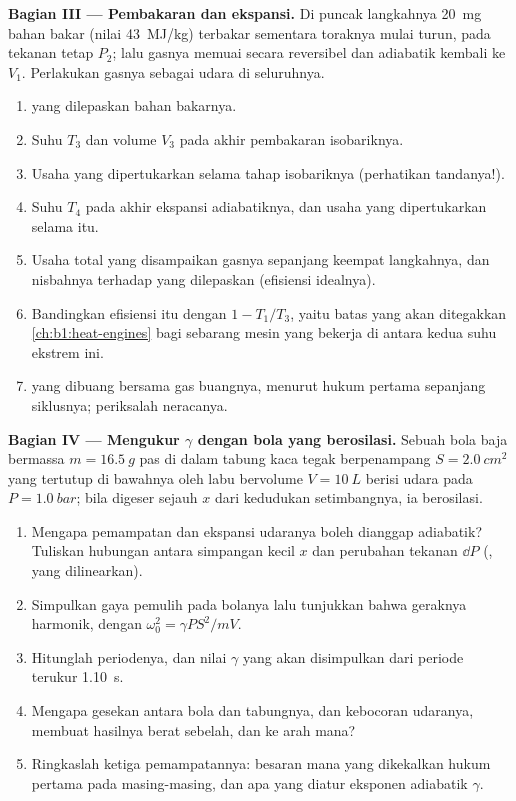 \begin{problem}
\medskip
\noindent\textbf{Bagian III --- Pembakaran dan ekspansi.}
Di puncak langkahnya \qty{20}{mg} bahan bakar (nilai 
\qty{43}{MJ/kg}) terbakar sementara toraknya mulai turun, pada tekanan tetap
$P_2$; lalu gasnya memuai secara reversibel dan adiabatik kembali ke $V_1$.
Perlakukan gasnya sebagai udara di seluruhnya.
\begin{enumerate}[resume]
  \item {} yang dilepaskan bahan bakarnya.
  \item Suhu $T_3$ dan volume $V_3$ pada akhir pembakaran
        isobariknya.
  \item Usaha yang dipertukarkan selama tahap isobariknya (perhatikan tandanya!).
  \item Suhu $T_4$ pada akhir ekspansi adiabatiknya, dan
        usaha yang dipertukarkan selama itu.
  \item Usaha total yang disampaikan gasnya sepanjang keempat langkahnya, dan
        nisbahnya terhadap  yang dilepaskan (efisiensi idealnya).
  \item Bandingkan efisiensi itu dengan $1 - T_1/T_3$, yaitu batas yang akan
        ditegakkan \cref{ch:b1:heat-engines} bagi sebarang mesin yang bekerja
        di antara kedua suhu ekstrem ini.
  \item {} yang dibuang bersama gas buangnya, menurut hukum pertama sepanjang siklusnya;
        periksalah neracanya.
\end{enumerate}

\medskip
\noindent\textbf{Bagian IV --- Mengukur $\gamma$ dengan bola yang berosilasi.}
Sebuah bola baja bermassa $m = \qty{16.5}{g}$ pas di dalam tabung kaca tegak
berpenampang $S = \qty{2.0}{cm^2}$ yang tertutup di bawahnya oleh labu
bervolume $V = \qty{10}{L}$ berisi udara pada $P = \qty{1.0}{bar}$; bila digeser sejauh $x$
dari kedudukan setimbangnya, ia berosilasi.
\begin{enumerate}[resume]
  \item Mengapa pemampatan dan ekspansi udaranya boleh dianggap
        adiabatik? Tuliskan hubungan antara simpangan kecil $x$
        dan perubahan tekanan $\dd P$ (, yang dilinearkan).
  \item Simpulkan gaya pemulih pada bolanya lalu tunjukkan bahwa geraknya
        harmonik, dengan $\omega_0^2 = \gamma PS^2/mV$.
  \item Hitunglah periodenya, dan nilai $\gamma$ yang akan disimpulkan
        dari periode terukur \qty{1.10}{s}.
  \item Mengapa gesekan antara bola dan tabungnya, dan kebocoran udaranya, membuat
        hasilnya berat sebelah, dan ke arah mana?
  \item Ringkaslah ketiga pemampatannya: besaran mana yang dikekalkan hukum
        pertama pada masing-masing, dan apa yang diatur eksponen adiabatik
        $\gamma$.
\end{enumerate}
\end{problem}
